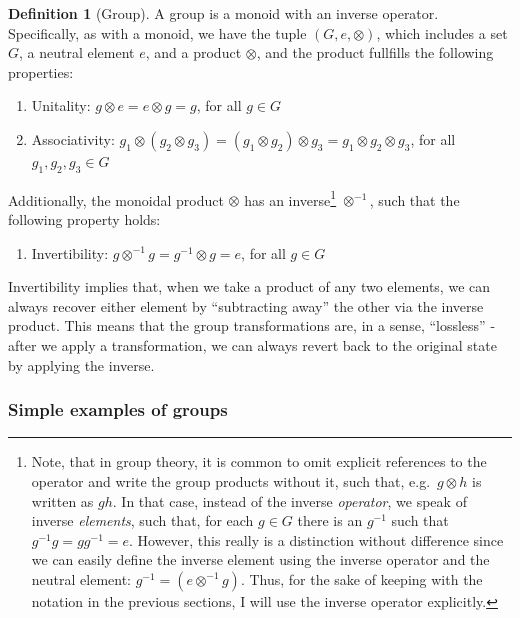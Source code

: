 \documentclass[
]{book}
\providecommand{\tightlist}{%
  \setlength{\itemsep}{0pt}\setlength{\parskip}{0pt}}
\theoremstyle{definition}
\newtheorem{definition}{Definition}[chapter]
\theoremstyle{definition}
\theoremstyle{definition}
\theoremstyle{definition}
\theoremstyle{remark}
\begin{document}
\begin{definition}[Group]

A group is a monoid with an inverse operator. Specifically, as with a monoid, we have the tuple \((G, e, \otimes)\), which includes a set \(G\), a neutral element \(e\), and a product \(\otimes\), and the product fullfills the following properties:

\begin{enumerate}
\def\labelenumi{\arabic{enumi}.}
\tightlist
\item
  Unitality: \(g \otimes e = e \otimes g = g\), for all \(g \in G\)
\item
  Associativity: \(g_1 \otimes (g_2 \otimes g_3) = (g_1 \otimes g_2) \otimes g_3 = g_1 \otimes g_2 \otimes g_3\), for all \(g_1, g_2, g_3 \in G\)
\end{enumerate}

Additionally, the monoidal product \(\otimes\) has an inverse\footnote{Note, that in group theory, it is common to omit explicit references to the operator and write the group products without it, such that, e.g.~\(g \otimes h\) is written as \(gh\). In that case, instead of the inverse \emph{operator}, we speak of inverse \emph{elements}, such that, for each \(g \in G\) there is an \(g^{-1}\) such that \(g^{-1}g = gg^{-1} = e\). However, this really is a distinction without difference since we can easily define the inverse element using the inverse operator and the neutral element: \(g^{-1} = (e \otimes^{-1}g)\). Thus, for the sake of keeping with the notation in the previous sections, I will use the inverse operator explicitly.} \(\otimes^{-1}\), such that the following property holds:

\begin{enumerate}
\def\labelenumi{\arabic{enumi}.}
\setcounter{enumi}{2}
\tightlist
\item
  Invertibility: \(g \otimes^{-1} g = g^{-1} \otimes g = e\), for all \(g \in G\)
\end{enumerate}

\end{definition}

Invertibility implies that, when we take a product of any two elements, we can always recover either element by ``subtracting away'' the other via the inverse product. This means that the group transformations are, in a sense, ``lossless'' - after we apply a transformation, we can always revert back to the original state by applying the inverse.

\subsubsection{Simple examples of groups}\label{simple-examples-of-groups}
\end{document}
